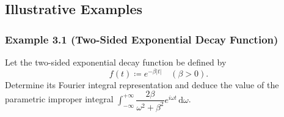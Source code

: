 \documentclass[11pt,a4paper]{article}
\theoremstyle{definition}
\theoremstyle{plain}
\begin{document}
\subsection{Illustrative Examples}

\subsubsection*{Example 3.1 (Two-Sided Exponential Decay Function)}

Let the two-sided exponential decay function be defined by
\begin{equation}
f(t) \coloneqq e^{-\beta |t|} \quad (\beta > 0).
\end{equation}
Determine its Fourier integral representation and deduce the value of the parametric improper integral $\int_{-\infty}^{+\infty} \dfrac{2\beta}{\omega^2 + \beta^2} e^{i\omega t} \, \mathrm{d}\omega$.
\end{document}
